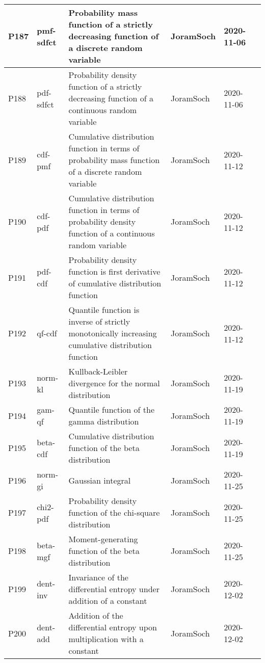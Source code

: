 \documentclass[a4paper,12pt,twoside]{book}
\begin{document}
\begin{longtable}{|p{1cm}|p{2cm}|p{6.5cm}|p{3cm}|p{2cm}|c|}
P187 & pmf-sdfct & Probability mass function of a strictly decreasing function of a discrete random variable & JoramSoch & 2020-11-06 & \pageref{sec:pmf-sdfct} \\ \hline
P188 & pdf-sdfct & Probability density function of a strictly decreasing function of a continuous random variable & JoramSoch & 2020-11-06 & \pageref{sec:pdf-sdfct} \\ \hline
P189 & cdf-pmf & Cumulative distribution function in terms of probability mass function of a discrete random variable & JoramSoch & 2020-11-12 & \pageref{sec:cdf-pmf} \\ \hline
P190 & cdf-pdf & Cumulative distribution function in terms of probability density function of a continuous random variable & JoramSoch & 2020-11-12 & \pageref{sec:cdf-pdf} \\ \hline
P191 & pdf-cdf & Probability density function is first derivative of cumulative distribution function & JoramSoch & 2020-11-12 & \pageref{sec:pdf-cdf} \\ \hline
P192 & qf-cdf & Quantile function is inverse of strictly monotonically increasing cumulative distribution function & JoramSoch & 2020-11-12 & \pageref{sec:qf-cdf} \\ \hline
P193 & norm-kl & Kullback-Leibler divergence for the normal distribution & JoramSoch & 2020-11-19 & \pageref{sec:norm-kl} \\ \hline
P194 & gam-qf & Quantile function of the gamma distribution & JoramSoch & 2020-11-19 & \pageref{sec:gam-qf} \\ \hline
P195 & beta-cdf & Cumulative distribution function of the beta distribution & JoramSoch & 2020-11-19 & \pageref{sec:beta-cdf} \\ \hline
P196 & norm-gi & Gaussian integral & JoramSoch & 2020-11-25 & \pageref{sec:norm-gi} \\ \hline
P197 & chi2-pdf & Probability density function of the chi-square distribution & JoramSoch & 2020-11-25 & \pageref{sec:chi2-pdf} \\ \hline
P198 & beta-mgf & Moment-generating function of the beta distribution & JoramSoch & 2020-11-25 & \pageref{sec:beta-mgf} \\ \hline
P199 & dent-inv & Invariance of the differential entropy under addition of a constant & JoramSoch & 2020-12-02 & \pageref{sec:dent-inv} \\ \hline
P200 & dent-add & Addition of the differential entropy upon multiplication with a constant & JoramSoch & 2020-12-02 & \pageref{sec:dent-add} \\ \hline
\end{longtable}
\end{document}
